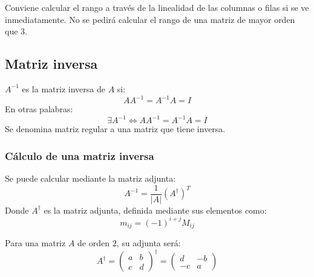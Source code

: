 \documentclass[arial,a4paper,print]{article}
\begin{document}
Conviene calcular el rango a través de la linealidad de las columnas o filas si se ve inmediatamente. No se pedirá calcular el rango de una matriz de mayor orden que 3.  

\subsection{Matriz inversa}
 $A^{-1}$ es la matriz inversa de $A$ si:
\begin{equation*}
	AA^{-1} = A^{-1}A = I
\end{equation*}
En otras palabras:
\begin{equation*}
	\exists A^{-1} \iff AA^{-1} = A^{-1}A = I
\end{equation*}
Se denomina matriz regular a una matriz que tiene inversa. 

\subsubsection{Cálculo de una matriz inversa}

Se puede calcular mediante la matriz adjunta:
\begin{equation*}
	A^{-1} = \frac{1}{|A|} (A^{\dagger})^{T}
\end{equation*}
Donde $A^{\dagger}$ es la matriz adjunta, definida mediante sus elementos como:
\begin{equation}
	m_{ij} = (-1)^{i+j}M_{ij}
\label{eq:matriz-adjunta}
\end{equation}

Para una matriz $A$ de orden $2$, su adjunta será:
\begin{equation}
	A^{\dagger} = \begin{pmatrix}
		a & b \\ c & d
	\end{pmatrix}^{\dagger} = \begin{pmatrix}
	d & -b \\ -c & a
\end{pmatrix}
\label{eq:2adjunt}
\end{equation}
\end{document}

